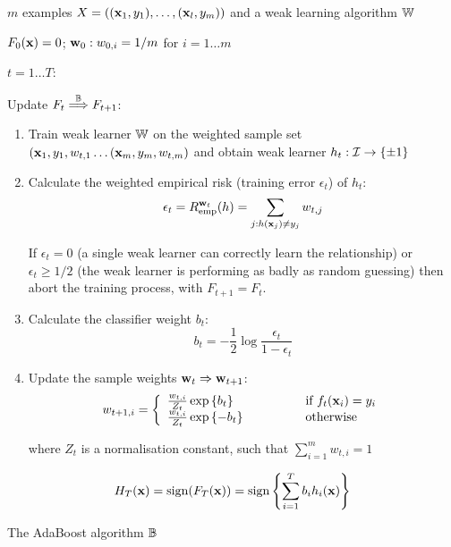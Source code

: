 \begin{linefigure}
\label{fig:boosting algorithm}
 $m$ examples $X = ((\mathbf{x}_1, y_1), \ldots, (\mathbf{x}_l,
y_m))$ and a weak learning algorithm $\mathbb{W}$
\par
{} $F_0(\mathbf{x}) = 0$; $\mathbf{w}_0 : w_{0,i} = 1/m$ for
$i=1 \ldots m$ 
\par
{} $t=1 \ldots T$:
\par
\noindent Update $F_t \stackrel{\mathbb{B}}{\Longrightarrow} F_{t+1}$: 
\par
\begin{enumerate}

\item	Train weak learner $\mathbb{W}$ on the weighted sample set 
	$(\mathbf{x}_1, y_1, w_{t,1} \ldots (\mathbf{x}_m, y_m, w_{t,m})$
	and obtain weak learner $h_t : \mathcal{I} \rightarrow \{\pm 1\}$

\item	Calculate the weighted empirical risk (training error
	$\epsilon_t$) of $h_t$: 
	\begin{equation}
	\epsilon_t = R_{\mathrm{emp}}^{\mathbf{w}_t}(h) = \sum_{j : h(\mathbf{x}_j) \neq
	y_j} w_{t,j}
	\end{equation}

	If $\epsilon_t = 0$ (a single weak learner can correctly learn
	the relationship) or $\epsilon_t \geq 1/2$ (the weak
	learner is performing as badly as random guessing) then abort
	the training process, with $F_{t+1} = F_{t}$.

\item	Calculate the classifier weight $b_t$:
	\begin{equation}
	b_t = - \frac{1}{2} \log \frac{\epsilon_t}{1 - \epsilon_t}
	\end{equation}

\item	Update the sample weights $\mathbf{w}_t \Rightarrow \mathbf{w}_{t+1}$:
	\begin{equation}
	w_{t+1, i} = \left\{
	\begin{array}{ll}
		\frac{w_{t, i}}{Z_t} \exp \left\{ b_t \right\}&	\qquad
		\qquad \mbox{if  $f_t(\mathbf{x}_i) = y_i$} \\
		\frac{w_{t, i}}{Z_t} \exp \left\{ -b_t \right\} & \qquad \qquad
		\mbox{otherwise} \\
	\end{array} \right.
	\label{eqn:sample weight update}
	\end{equation}

	where $Z_t$ is a normalisation constant, such that
	$\sum_{i=1}^{m} w_{t, i} = 1$
\end{enumerate}

\par
{} 
\begin{equation}
H_T(\mathbf{x}) = \mathrm{sign} (F_T(\mathbf{x})) = \mathrm{sign} \left\{ \sum_{i=1}^T b_i
h_i(\mathbf{x}) \right\} 
\end{equation}
\caption{The AdaBoost algorithm $\mathbb{B}$}
\end{linefigure}


